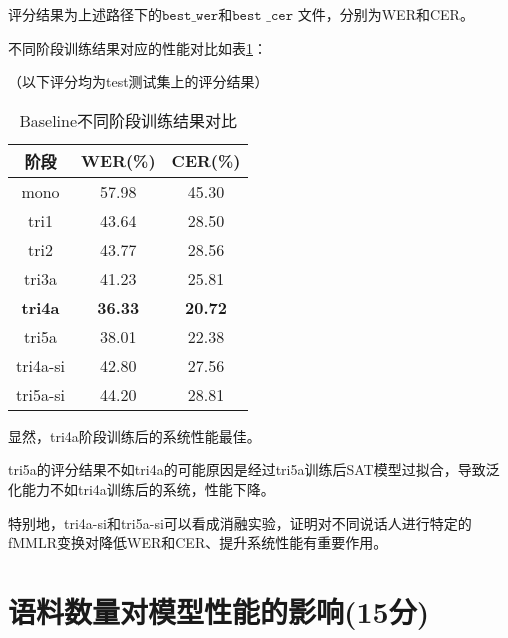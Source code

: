 \documentclass[a4paper]{article}
\renewcommand{\tt}[1]{\mathtt{#1}}
\begin{document}
\vspace{-1em}
评分结果为上述路径下的$\tt{best\_wer}$和$\tt{best}$ $\_\tt{cer}$ 文件，分别为WER和CER。

\vspace{1em}
不同阶段训练结果对应的性能对比如表\ref{tab2}：

（以下评分均为test测试集上的评分结果）

\begin{table}[th]
  \centering
  \begin{tabular}{ c | c c }
    \toprule
    \textbf{阶段} & \textbf{WER(\%)} & \textbf{CER(\%)} \\
    \midrule
    mono & 57.98 & 45.30 \\
    tri1 & 43.64 & 28.50 \\
    tri2 & 43.77 & 28.56 \\
    tri3a & 41.23 & 25.81 \\
    \textbf{tri4a} & \textbf{36.33} & \textbf{20.72} \\
    tri5a & 38.01 & 22.38 \\
    \midrule
    tri4a-si & 42.80 & 27.56 \\
    tri5a-si & 44.20 & 28.81 \\
    \bottomrule
  \end{tabular}
  \vspace{0.5em}
  \centering \caption{Baseline不同阶段训练结果对比}
  \label{tab2}
\end{table}


显然，tri4a阶段训练后的系统性能最佳。

tri5a的评分结果不如tri4a的可能原因是经过tri5a训练后SAT模型过拟合，导致泛化能力不如tri4a训练后的系统，性能下降。

特别地，tri4a-si和tri5a-si可以看成消融实验，证明对不同说话人进行特定的fMMLR变换对降低WER和CER、提升系统性能有重要作用。






\section{语料数量对模型性能的影响(15分)}
\end{document}
